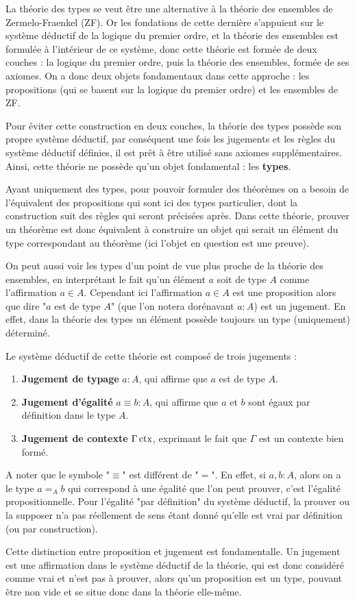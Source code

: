 \documentclass[../../rapport.tex]{subfiles}
\begin{document}
  La théorie des types se veut être une alternative à la théorie des ensembles de Zermelo-Fraenkel (ZF).
  Or les fondations de cette dernière s'appuient sur le système déductif de la logique du premier ordre,
  et la théorie des ensembles est formulée à l'intérieur de ce système, donc cette théorie est formée
  de deux couches : la logique du premier ordre, puis la théorie des ensembles, formée de ses axiomes.
  On a donc deux objets fondamentaux dans cette approche :
  les propositions (qui se basent sur la logique du premier ordre) et les ensembles de ZF.

  Pour éviter cette construction en deux couches, la théorie des types possède son propre système déductif,
  par conséquent une fois les jugements et les règles du système déductif définies,
  il est prêt à être utilisé sans axiomes supplémentaires.
  Ainsi, cette théorie ne possède qu'un objet fondamental : les \textbf{types}.

  Ayant uniquement des types, pour pouvoir formuler des théorèmes on a besoin de l'équivalent des propositions
  qui sont ici des types particulier, dont la construction suit des règles qui seront précisées après.
  Dans cette théorie, prouver un théorème est donc équivalent à construire un objet
  qui serait un élément du type correspondant au théorème (ici l'objet en question est une preuve).

  On peut aussi voir les types d'un point de vue plus proche de la théorie des ensembles,
  en interprétant le fait qu'un élément $a$ soit de type $A$ comme l'affirmation $a \in A$.
  Cependant ici l'affirmation $a \in A$ est une proposition alors que dire "$a$ est de type $A$"
  (que l'on notera dorénavant $a : A$) est un jugement. En effet,
  dans la théorie des types un élément possède toujours un type (uniquement) déterminé.

  Le système déductif de cette théorie est composé de trois jugements :
  \begin{enumerate}
    \item \textbf{Jugement de typage} $a : A$, qui affirme que $a$ est de type $A$.
    \item \textbf{Jugement d'égalité} $a \equiv b : A$, qui affirme que $a$ et $b$ sont égaux par définition dans le type $A$.
    \item \textbf{Jugement de contexte} $\Gamma \operatorname{ctx}$, exprimant le fait que $\Gamma$ est un contexte bien formé.
  \end{enumerate}
  A noter que le symbole "$\equiv$" est différent de "$=$".
  En effet, si $a, b : A$, alors on a le type $a =_A b$ qui correspond à une égalité
  que l'on peut prouver, c'est l'égalité propositionnelle.
  Pour l'égalité "par définition" du système déductif, la prouver ou la supposer n'a pas réellement de sens
  étant donné qu'elle est vrai par définition (ou par construction).

  Cette distinction entre proposition et jugement est fondamentalle.
  Un jugement est une affirmation dans le système déductif de la théorie, qui est donc considéré comme vrai et n'est pas à prouver,
  alors qu'un proposition est un type, pouvant être non vide et se situe donc dans la théorie elle-même.
\end{document}
